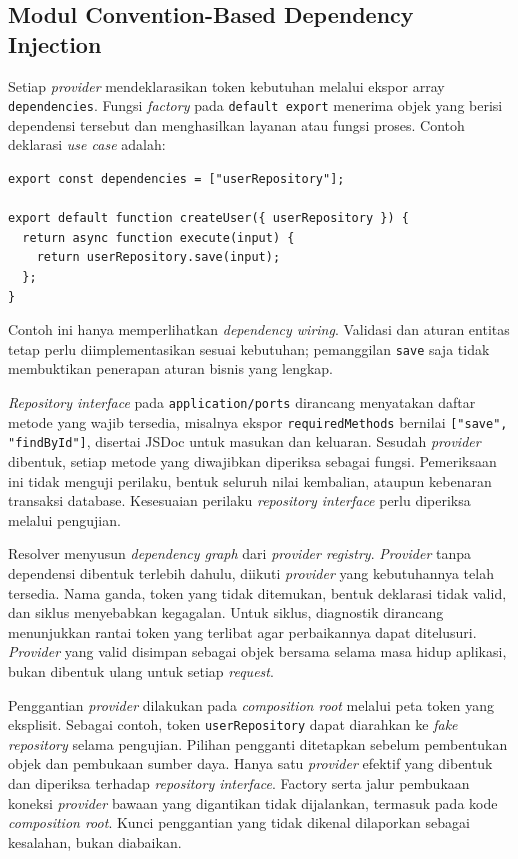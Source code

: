\documentclass[12pt,a4paper,oneside]{report}
\begin{document}
\subsection{Modul Convention-Based Dependency Injection}
Setiap \textit{provider} mendeklarasikan token kebutuhan melalui ekspor array \texttt{depen\-dencies}. Fungsi \textit{factory} pada \texttt{default export} menerima objek yang berisi dependensi tersebut dan menghasilkan layanan atau fungsi proses. Contoh deklarasi \textit{use case} adalah:
\begin{samepage}
\begin{singlespace}
\begin{verbatim}
export const dependencies = ["userRepository"];

export default function createUser({ userRepository }) {
  return async function execute(input) {
    return userRepository.save(input);
  };
}
\end{verbatim}
\end{singlespace}
\end{samepage}
Contoh ini hanya memperlihatkan \textit{dependency wiring}. Validasi dan aturan entitas tetap perlu diimplementasikan sesuai kebutuhan; pemanggilan \texttt{save} saja tidak membuktikan penerapan aturan bisnis yang lengkap.

\textit{Repository interface} pada \texttt{application/\allowbreak ports} dirancang menyatakan daftar metode yang wajib tersedia, misalnya ekspor \texttt{requiredMethods} bernilai \texttt{["save", "findById"]}, disertai JSDoc untuk masukan dan keluaran. Sesudah \textit{provider} dibentuk, setiap metode yang diwajibkan diperiksa sebagai fungsi. Pemeriksaan ini tidak menguji perilaku, bentuk seluruh nilai kembalian, ataupun kebenaran transaksi database. Kesesuaian perilaku \textit{repository interface} perlu diperiksa melalui pengujian.

Resolver menyusun \textit{dependency graph} dari \textit{provider registry}. \textit{Provider} tanpa dependensi dibentuk terlebih dahulu, diikuti \textit{provider} yang kebutuhannya telah tersedia. Nama ganda, token yang tidak ditemukan, bentuk deklarasi tidak valid, dan siklus menyebabkan kegagalan. Untuk siklus, diagnostik dirancang menunjukkan rantai token yang terlibat agar perbaikannya dapat ditelusuri. \textit{Provider} yang valid disimpan sebagai objek bersama selama masa hidup aplikasi, bukan dibentuk ulang untuk setiap \textit{request}.

Penggantian \textit{provider} dilakukan pada \textit{composition root} melalui peta token yang eksplisit. Sebagai contoh, token \texttt{userRepository} dapat diarahkan ke \textit{fake repository} selama pengujian. Pilihan pengganti ditetapkan sebelum pembentukan objek dan pembukaan sumber daya. Hanya satu \textit{provider} efektif yang dibentuk dan diperiksa terhadap \textit{repository interface}. Factory serta jalur pembukaan koneksi \textit{provider} bawaan yang digantikan tidak dijalankan, termasuk pada kode \textit{composition root}. Kunci penggantian yang tidak dikenal dilaporkan sebagai kesalahan, bukan diabaikan.
\end{document}
